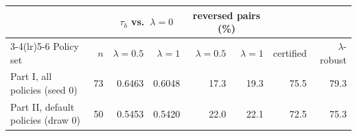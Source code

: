 \begin{tabular}{lrrrrrrr}
\toprule
 & & \multicolumn{2}{c}{$\tau_b$ vs.\ $\lambda{=}0$} & \multicolumn{2}{c}{reversed pairs (\%)} & & \\
\cmidrule(lr){3-4}\cmidrule(lr){5-6}
Policy set & $n$ & $\lambda{=}0.5$ & $\lambda{=}1$ & $\lambda{=}0.5$ & $\lambda{=}1$ & certified & $\lambda$-robust \\
\midrule
Part I, all policies (seed 0) & 73 & 0.6463 & 0.6048 & 17.3 & 19.3 & 75.5 & 79.3 \\
Part II, default policies (draw 0) & 50 & 0.5453 & 0.5420 & 22.0 & 22.1 & 72.5 & 75.3 \\
\bottomrule
\end{tabular}
